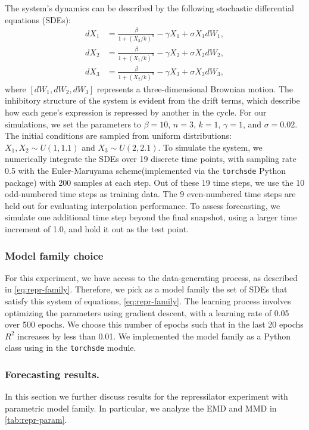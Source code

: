 The system’s dynamics can be described by the following stochastic differential equations (SDEs):
\begin{align}
\label{eq:repr-family}
    dX_1 &= \frac{\beta}{1+(X_3/k)^n} - \gamma X_1 + \sigma X_1 dW_1, \nonumber \\
    dX_2 &= \frac{\beta}{1+(X_1/k)^n} - \gamma X_2 + \sigma X_2 dW_2, \\
    dX_3 &= \frac{\beta}{1+(X_2/k)^n} - \gamma X_3 + \sigma X_3 dW_3, \nonumber
\end{align}
where $[dW_1, dW_2, dW_3]$ represents a three-dimensional Brownian motion. The inhibitory structure of the system is evident from the drift terms, which describe how each gene’s expression is repressed by another in the cycle. For our simulations, we set the parameters to $\beta = 10$, $n = 3$, $k = 1$, $\gamma = 1$, and $\sigma = 0.02$. The initial conditions are sampled from uniform distributions: $X_1, X_2 \sim U(1,1.1)$ and $X_3 \sim U(2,2.1)$. To simulate the system, we numerically integrate the SDEs over 19 discrete time points, with sampling rate 0.5 with the Euler-Maruyama scheme(implemented via the \texttt{torchsde} Python package) with 200 samples at each step. Out of these 19 time steps, we use the 10 odd-numbered time steps as training data. The 9 even-numbered time steps are held out for evaluating interpolation performance. To assess forecasting, we simulate one additional time step beyond the final snapshot, using a larger time increment of 1.0, and hold it out as the test point.


\subsubsection{Model family choice}
\label{app:repr_implementation-parametric}
For this experiment, we have access to the data-generating process, as described in \cref{eq:repr-family}. Therefore, we pick as a model family the set of SDEs that satisfy this system of equations, \cref{eq:repr-family}. The learning process involves optimizing the parameters using gradient descent, with a learning rate of 0.05 over 500 epochs. We choose this number of epochs such that in the last 20 epochs $R^2$ increases by less than 0.01. We implemented the model family as a Python class using in the \texttt{torchsde} \citep{li2020scalable} module.

\subsubsection{Forecasting results.}
\label{app:repr-forecasting-parametric}
In this section we further discuss results for the repressilator experiment with parametric model family. In particular, we analyze the EMD and MMD in \cref{tab:repr-param}.

